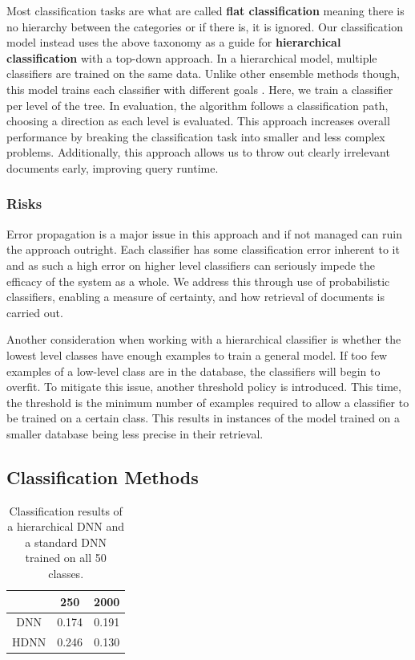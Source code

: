 Most classification tasks are what are called \textbf{flat classification}
meaning there is no hierarchy between the categories or if there is, it is
ignored. Our classification model instead uses the above taxonomy as a guide for \textbf{hierarchical classification} with a top-down approach. In a hierarchical model, multiple classifiers are trained on the same data. Unlike other ensemble methods though, this model trains each classifier with different goals \cite{chou-hierarchical-2003}. Here, we train a classifier per level of the tree. In evaluation, the algorithm follows a classification path, choosing a direction as each level is evaluated. This approach increases overall performance by breaking the classification task into smaller and less complex problems. Additionally, this approach allows us to throw out clearly irrelevant documents early, improving query runtime.

\subsubsection{Risks}
Error propagation is a major issue in this approach and if not managed can ruin the approach outright. Each classifier has some classification error inherent to it and as such a high error on higher level classifiers can seriously impede the efficacy of the system as a whole. We address this through use of probabilistic classifiers, enabling a measure of certainty, and how retrieval of documents is carried out.

Another consideration when working with a hierarchical classifier is whether the lowest level classes have enough examples to train a general model. If too few examples of a low-level class are in the database, the classifiers will begin to overfit. To mitigate this issue, another threshold policy is introduced. This time, the threshold is the minimum number of examples required to allow a classifier to be trained on a certain class. This results in instances of the model trained on a smaller database being less precise in their retrieval.

\subsection{Classification Methods}

\begin{table}[t]
    \centering
    \begin{tabular}{ccc}
         & 250   & 2000  \\ \hline
    DNN  & 0.174 & 0.191 \\
    HDNN & 0.246 & 0.130
    \end{tabular}
    \caption{Classification results of a hierarchical DNN and a standard DNN trained on all 50 classes.}
    \label{tab:classifier}
\end{table}

